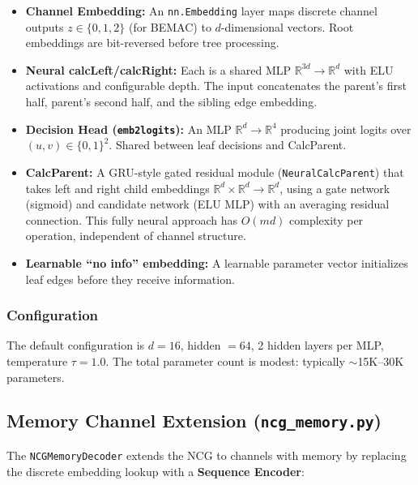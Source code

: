\documentclass[11pt,a4paper]{article}
\begin{document}
\begin{itemize}
  \item \textbf{Channel Embedding:} An \texttt{nn.Embedding} layer maps
        discrete channel outputs $z \in \{0, 1, 2\}$ (for BEMAC) to
        $d$-dimensional vectors. Root embeddings are bit-reversed before
        tree processing.

  \item \textbf{Neural calcLeft/calcRight:} Each is a shared MLP
        $\mathbb{R}^{3d} \to \mathbb{R}^d$ with ELU activations and
        configurable depth. The input concatenates the parent's first half,
        parent's second half, and the sibling edge embedding.

  \item \textbf{Decision Head (\texttt{emb2logits}):} An MLP
        $\mathbb{R}^d \to \mathbb{R}^4$ producing joint logits over
        $(u, v) \in \{0,1\}^2$. Shared between leaf decisions and
        CalcParent.

  \item \textbf{CalcParent:} A GRU-style gated residual module
        (\texttt{NeuralCalcParent}) that takes left and right child
        embeddings $\mathbb{R}^d \times \mathbb{R}^d \to \mathbb{R}^d$,
        using a gate network (sigmoid) and candidate network (ELU MLP)
        with an averaging residual connection. This fully neural approach
        has $O(md)$ complexity per operation, independent of channel structure.

  \item \textbf{Learnable ``no info'' embedding:} A learnable parameter
        vector initializes leaf edges before they receive information.
\end{itemize}

\subsubsection{Configuration}

The default configuration is $d = 16$, hidden $= 64$, 2 hidden layers per
MLP, temperature $\tau = 1.0$. The total parameter count is modest:
typically $\sim$15K--30K parameters.

\subsection{Memory Channel Extension (\texttt{ncg\_memory.py})}

The \texttt{NCGMemoryDecoder} extends the NCG to channels with memory by
replacing the discrete embedding lookup with a \textbf{Sequence Encoder}:
\end{document}
